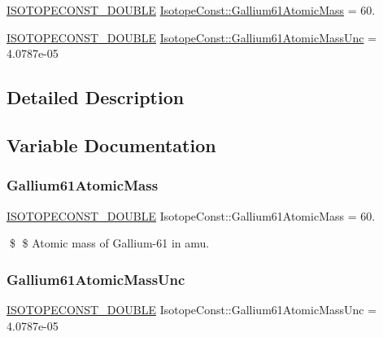 \begin{DoxyCompactItemize}
\item 
\mbox{\hyperlink{group___isotope_const-_macros_ga8f45a7272ce02c0b4c65c44636ed719a}{I\+S\+O\+T\+O\+P\+E\+C\+O\+N\+S\+T\+\_\+\+D\+O\+U\+B\+LE}} \mbox{\hyperlink{group___isotope_const-_gallium-_ga61_gade55d5784093dafdf86b568fa6db5c13}{Isotope\+Const\+::\+Gallium61\+Atomic\+Mass}} = 60.
\item 
\mbox{\hyperlink{group___isotope_const-_macros_ga8f45a7272ce02c0b4c65c44636ed719a}{I\+S\+O\+T\+O\+P\+E\+C\+O\+N\+S\+T\+\_\+\+D\+O\+U\+B\+LE}} \mbox{\hyperlink{group___isotope_const-_gallium-_ga61_gad96db36c28d7119d734bbcb3b233065d}{Isotope\+Const\+::\+Gallium61\+Atomic\+Mass\+Unc}} = 4.\+0787e-\/05
\end{DoxyCompactItemize}


\subsection{Detailed Description}


\subsection{Variable Documentation}
\mbox{\label{group___isotope_const-_gallium-_ga61_gade55d5784093dafdf86b568fa6db5c13}} 
\subsubsection{\texorpdfstring{Gallium61\+Atomic\+Mass}{Gallium61AtomicMass}}
{\footnotesize\ttfamily \mbox{\hyperlink{group___isotope_const-_macros_ga8f45a7272ce02c0b4c65c44636ed719a}{I\+S\+O\+T\+O\+P\+E\+C\+O\+N\+S\+T\+\_\+\+D\+O\+U\+B\+LE}} Isotope\+Const\+::\+Gallium61\+Atomic\+Mass = 60.}

\$ \$ Atomic mass of Gallium-\/61 in amu. \mbox{\label{group___isotope_const-_gallium-_ga61_gad96db36c28d7119d734bbcb3b233065d}} 
\subsubsection{\texorpdfstring{Gallium61\+Atomic\+Mass\+Unc}{Gallium61AtomicMassUnc}}
{\footnotesize\ttfamily \mbox{\hyperlink{group___isotope_const-_macros_ga8f45a7272ce02c0b4c65c44636ed719a}{I\+S\+O\+T\+O\+P\+E\+C\+O\+N\+S\+T\+\_\+\+D\+O\+U\+B\+LE}} Isotope\+Const\+::\+Gallium61\+Atomic\+Mass\+Unc = 4.\+0787e-\/05}


